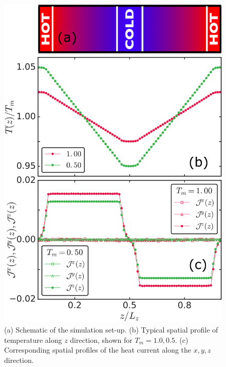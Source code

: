 \begin{figure}[hbt!]
    \centering
	\includegraphics[width=12cm]{figs/fig3p1.png}	
	\caption[{\em Schematic of the sumulation set-up, applied temperature gradient and resulting heat current}]{(a) Schematic of the simulation set-up.
		(b) Typical spatial profile of temperature along $z$ direction, shown for $T_m=1.0, 0.5$. 
		(c) Corresponding spatial profiles
		of the heat current along the $x, y, z$ direction.  \label{fig3p1}}
\end{figure}

